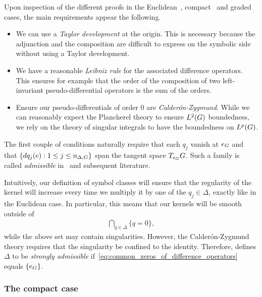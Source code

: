 Upon inspection of the different proofs in the Euclidean~\cite{Stein93},
compact~\cite{RuzhanskyTurunen10,Fischer2015} and graded~\cite{FischerRuzhansky16} cases,
the main requirements appear the following.
\begin{itemize}
    \item We can use a \emph{Taylor development} at the origin.
        This is necessary because the adjunction and the composition are difficult to express on the symbolic side without using a Taylor development.
    \item We have a reasonable \emph{Leibniz rule} for the associated difference operators.
        This ensures for example that the order of the composition of two left-invariant pseudo-differential operators is the sum of the orders.
    \item Ensure our pseudo-differentials of order $0$ are \emph{Calder\'on-Zygmund}.
        While we can reasonably expect the Plancherel theory to ensure ${L^{2} (G)}$ boundedness,
        we rely on the theory of singular integrals to have the boundedness on ${L^{p} (G)}$.
\end{itemize}

The first couple of conditions naturally require that each $q_j$ vanish at $e_G$ and that $\{dq_j(e) : 1 \leq j \leq n_{\Delta, G}\}$ span the tangent space $T_{e_G} G$.
Such a family is called \emph{admissible} in~\cite{RuzhanskyTurunenWirth10} and subsequent literature.

Intuitively,
our definition of symbol classes will ensure that the regularity of the kernel will increase every time we multiply it by one of the $q_j \in \Delta$,
exactly like in the Euclidean case.
In particular,
this means that our kernels will be smooth outside of
\begin{align}
    \bigcap_{q \in \Delta} \{q = 0\},
    \label{eq:common_zeros_of_difference_operators}
\end{align}
while the above set may contain singularities.
However,
the Calder\'on-Zygmund theory requires that the singularity be confined to the identity.
Therefore,
\cite{RuzhanskyTurunenWirth10} defines $\Delta$ to be \emph{strongly admissible}
if~\eqref{eq:common_zeros_of_difference_operators} equals $\{e_G\}$.

\subsubsection*{The compact case}

